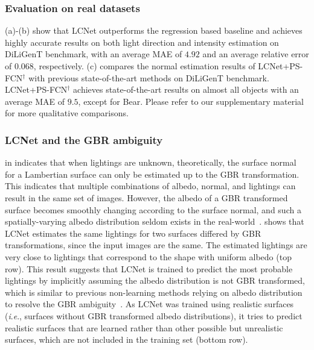 \documentclass[10pt,journal,compsoc]{IEEEtran}
\newcommand{\ie}{\textit{i}.\textit{e}.}
\newcommand{\rev}[1]{#1}
\begin{document}
\subsubsection{Evaluation on real datasets}
 (a)-(b) show that LCNet outperforms the regression based baseline \LCNetreg and achieves highly accurate results on both light direction and intensity estimation on DiLiGenT benchmark, with an average MAE of $4.92$ and an average relative error of $0.068$, respectively.
 (c) compares the normal estimation results of LCNet+PS-FCN$^\dag$ with previous state-of-the-art methods on DiLiGenT benchmark.
LCNet+PS-FCN$^\dag$ achieves state-of-the-art results on almost all objects with an average MAE of $9.5$, except for {\sc Bear}. 
Please refer to our supplementary material for more qualitative comparisons.




\subsubsection{LCNet and the GBR ambiguity}
\rev{ in  indicates that when lightings are unknown, theoretically, the surface normal for a Lambertian surface can only be estimated up to the GBR transformation. This indicates that multiple combinations of albedo, normal, and lightings can result in the same set of images.  
However, the albedo of a GBR transformed surface becomes smoothly changing according to the surface normal, and such a spatially-varying albedo distribution seldom exists in the real-world~\cite{belhumeur1999bas}. 
\Fref{fig:sphere_gbr} shows that LCNet estimates the same lightings for two surfaces differed by GBR transformations, since the input images are the same. The estimated lightings are very close to lightings that correspond to the shape with uniform albedo (top row).
This result suggests that LCNet is trained to predict the most probable lightings by implicitly assuming the albedo distribution is not GBR transformed, which is similar to previous non-learning methods relying on albedo distribution to resolve the GBR ambiguity~\cite{alldrin2007r,shi2010self,papad14closed}.
As LCNet was trained using realistic surfaces (\ie, surfaces without GBR transformed albedo distributions), it tries to predict realistic surfaces that are learned rather than other possible but unrealistic surfaces, which are not included in the training set (bottom row).
}
\end{document}
